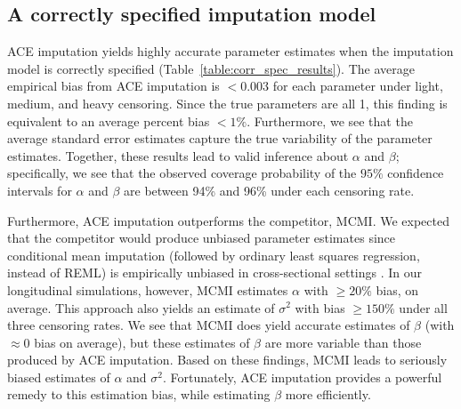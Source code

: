 \documentclass[12pt]{article}
\begin{document}
\subsection{A correctly specified imputation model}
\label{sec:sim_A}
ACE imputation yields highly accurate parameter estimates when the imputation model is correctly specified (Table~\ref{table:corr_spec_results}). The average empirical bias from ACE imputation is $< 0.003$ for each parameter under light, medium, and heavy censoring. Since the true parameters are all 1, this finding is equivalent to an average percent bias $< 1\%$. Furthermore, we see that the average standard error estimates capture the true variability of the parameter estimates. Together, these results lead to valid inference about $\alpha$ and $\beta$; specifically, we see that 
the observed coverage probability of the $95\%$ confidence intervals for $\alpha$ and $\beta$ are between 94\% and 96\% under each censoring rate.

Furthermore, ACE imputation outperforms the competitor, MCMI. We expected that the competitor would produce unbiased parameter estimates since conditional mean imputation (followed by ordinary least squares regression, instead of REML) is empirically unbiased in cross-sectional settings \citep{Atem2019}. In our longitudinal simulations, however, MCMI estimates $\alpha$ with $\geq 20\%$ bias, on average. This approach also yields an estimate of $\sigma^2$ with bias $\geq 150\%$ under all three censoring rates. We see that MCMI does yield accurate estimates of $\beta$ (with $\approx 0$ bias on average), but these estimates of $\beta$ are more variable than those produced by ACE imputation. Based on these findings, MCMI leads to seriously biased estimates of $\alpha$ and $\sigma^2$. Fortunately, ACE imputation provides a powerful remedy to this estimation bias, while estimating $\beta$ more efficiently.
\end{document}

